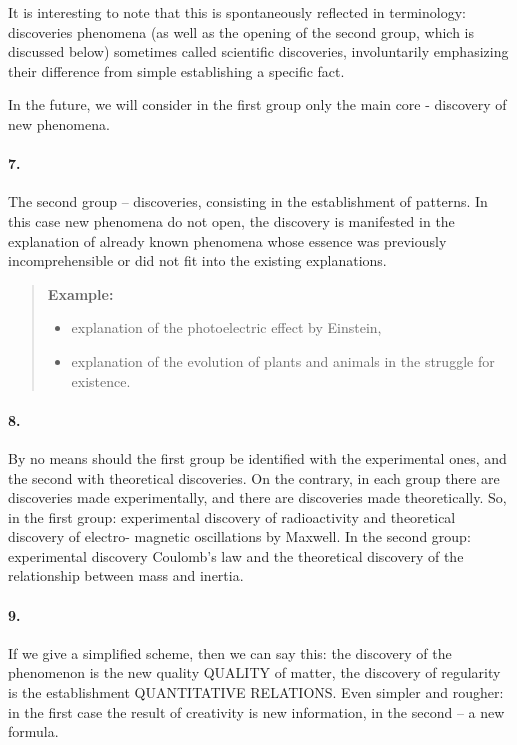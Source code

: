 \documentclass[11pt,a4paper]{article}
\newenvironment{example}{\begin{quote} \textbf{Example:}\par }{\end{quote}}
\begin{document}
It is interesting to note that this is spontaneously reflected in terminology:
discoveries phenomena (as well as the opening of the second group, which is
discussed below) sometimes called scientific discoveries, involuntarily
emphasizing their difference from simple establishing a specific fact.

In the future, we will consider in the first group only the main core -
discovery of new phenomena.

\paragraph{7.}
The second group -- discoveries, consisting in the establishment of patterns.
In this case new phenomena do not open, the discovery is manifested in the
explanation of already known phenomena whose essence was previously
incomprehensible or did not fit into the existing explanations.

\begin{example}
  \begin{itemize}
  \item explanation of the photoelectric effect by Einstein, 
  \item explanation of the evolution of plants and animals in the struggle for
    existence.
  \end{itemize}
\end{example}
\paragraph{8.}
By no means should the first group be identified with the experimental ones,
and the second with theoretical discoveries. On the contrary, in each group
there are discoveries made experimentally, and there are discoveries made
theoretically. So, in the first group: experimental discovery of radioactivity
and theoretical discovery of electro- magnetic oscillations by Maxwell. In the
second group: experimental discovery Coulomb's law and the theoretical
discovery of the relationship between mass and inertia.

\paragraph{9.}
If we give a simplified scheme, then we can say this: the discovery of the
phenomenon is the new quality QUALITY of matter, the discovery of regularity
is the establishment QUANTITATIVE RELATIONS. Even simpler and rougher: in the
first case the result of creativity is new information, in the second -- a new
formula.
\end{document}
